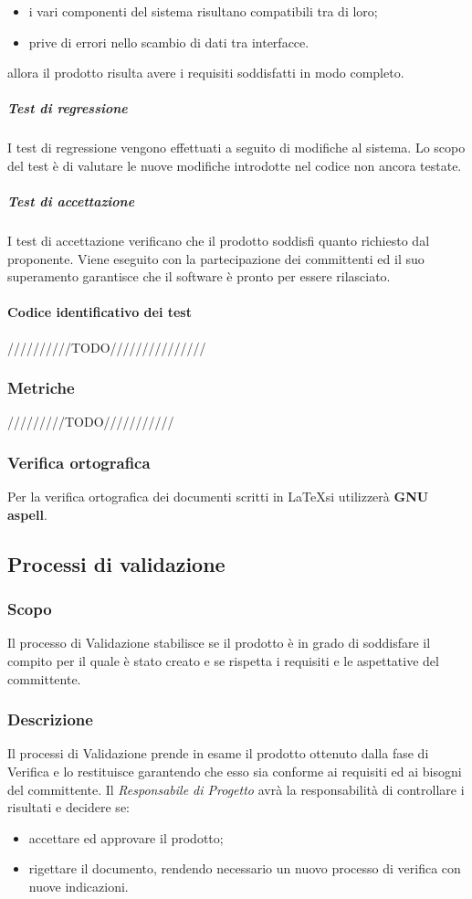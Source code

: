 \begin{itemize}
	\item i vari componenti del sistema risultano compatibili tra di loro;
	\item prive di errori nello scambio di dati tra interfacce.
\end{itemize}
allora il prodotto risulta avere i requisiti soddisfatti in modo completo.
\subparagraph{Test di regressione}
I test di regressione vengono effettuati a seguito di modifiche al sistema. Lo scopo del test è di valutare le nuove modifiche introdotte nel codice non ancora testate.
\subparagraph{Test di accettazione}
I test di accettazione verificano che il prodotto soddisfi quanto richiesto dal proponente. Viene eseguito con la partecipazione dei committenti ed il suo superamento garantisce che il software è pronto per essere rilasciato.
\paragraph{Codice identificativo dei test}
//////////TODO///////////////

\subsubsection{Metriche}
/////////TODO///////////

\subsubsection{Verifica ortografica}
Per la verifica ortografica dei documenti scritti in \LaTeX si utilizzerà  \textbf{GNU aspell}.
\subsection{Processi di validazione}
\subsubsection{Scopo}
Il processo di Validazione stabilisce se il prodotto è in grado di soddisfare il compito per il quale è stato creato e se  rispetta i requisiti e le aspettative del committente.
\subsubsection{Descrizione}
Il processi di Validazione prende in esame il prodotto ottenuto dalla fase di Verifica e lo restituisce garantendo che esso sia conforme ai requisiti ed ai bisogni del committente.
Il \textit{Responsabile di Progetto} avrà la responsabilità di controllare i risultati e decidere se:
\begin{itemize}
	\item accettare ed approvare il prodotto;
	\item rigettare il documento, rendendo necessario un nuovo processo di verifica con nuove indicazioni.
\end{itemize}
